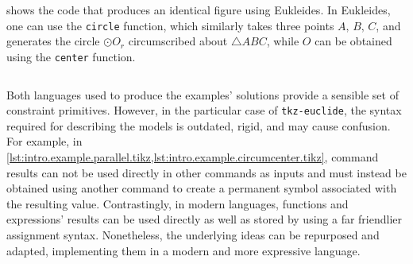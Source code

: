  shows the code
that produces an identical figure using Eukleides.  In Eukleides, one can use
the \texttt{circle} function, which similarly takes three points $A,\,B,\,C$,
and generates the circle $\odot O_r$ circumscribed about $\triangle ABC$, while
$O$ can be obtained using the \texttt{center} function.

\begin{listing}[htbp]
  \inputminted[highlightlines=2]{text}{euk/ex-circumcenter.euk}
  \caption[Circumcenter example from 
      using Eukleides]{%
    Circumcenter example from  using
    Eukleides.  The highlighted line shows how to obtain the center of $\odot
    O_r$ via the non-degenerate triangle $\triangle ABC$.}
  \label{lst:intro.example.circumcenter.euk}
\end{listing}

Both languages used to produce the examples' solutions provide a sensible set of
constraint primitives.  However, in the particular case of \texttt{tkz-euclide},
the syntax required for describing the models is outdated, rigid, and may cause
confusion.  For example, in
\cref{lst:intro.example.parallel.tikz,lst:intro.example.circumcenter.tikz},
command results can not be used directly in other commands as inputs and must
instead be obtained using another command to create a permanent symbol
associated with the resulting value.  Contrastingly, in modern languages,
functions and expressions' results can be used directly as well as stored by
using a far friendlier assignment syntax.  Nonetheless, the underlying ideas can
be repurposed and adapted, implementing them in a modern and more expressive
language.
